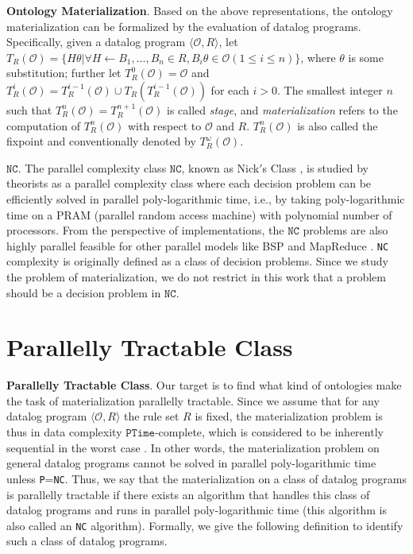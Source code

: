 \documentclass{article}
\begin{document}
\textbf{Ontology Materialization}. Based on the above representations, the ontology materialization can be formalized by the evaluation of datalog programs. Specifically, given a datalog program $\langle\mathcal{O}, R\rangle$, let $T_R(\mathcal{O})=\{H\theta|\forall H\leftarrow B_1,...,B_n\in R, B_i\theta\in\mathcal{O} (1\leq i\leq n)\}$, where $\theta$ is some substitution; further let $T_R^{0}(\mathcal{O})=\mathcal{O}$ and $T_R^{i}(\mathcal{O})=T_R^{i-1}(\mathcal{O})\cup T_R(T_R^{i-1}(\mathcal{O}))$ for each $i>0$. The
smallest integer $n$ such that $T_R^{n}(\mathcal{O})= T_R^{n+1}(\mathcal{O})$ is called \emph{stage}, and \emph{materialization} refers to the computation of $T_R^{n}(\mathcal{O})$ with respect to $\mathcal{O}$ and $R$. $T_R^{n}(\mathcal{O})$ is also called the fixpoint and conventionally denoted by $T_R^{\omega}(\mathcal{O})$.

\textbf{$\texttt{NC}$}. The parallel complexity class $\texttt{NC}$, known as Nick$'$s Class \cite{RAYMOND-GREENLAW}, is studied by theorists as a parallel complexity class where each decision problem can be efficiently solved in parallel poly-logarithmic time, i.e., by taking
poly-logarithmic time on a PRAM (parallel random access machine) with polynomial number of processors.
From the
perspective of implementations, the $\texttt{NC}$ problems are also highly parallel feasible for
other parallel models like BSP \cite{DBLP:journals/cacm/Valiant90} and MapReduce \cite{DBLP:conf/soda/KarloffSV10}. \texttt{NC} complexity is originally defined as a class of decision problems. Since we study the problem of materialization, we do not restrict in this work that a
problem should be a decision problem in $\texttt{NC}$.

\section{Parallelly Tractable Class}

\noindent\textbf{Parallelly Tractable Class}. Our target is to find what kind of ontologies make the task of materialization parallelly tractable. Since we assume that for any datalog program $\langle\mathcal{O}, R\rangle$ the rule set $R$ is fixed, the materialization problem is thus in data complexity $\texttt{PTime}$-complete, which is considered to be inherently sequential in the worst case \cite{RAYMOND-GREENLAW}. In other words, the materialization problem on general datalog programs cannot be solved in parallel poly-logarithmic time unless \texttt{P}=\texttt{NC}. Thus, we say that
the materialization on a class of datalog programs is parallelly tractable if there exists an algorithm that handles this class of datalog programs and runs in parallel poly-logarithmic time (this algorithm is also called an \texttt{NC} algorithm). Formally, we give the following definition to identify such a class of datalog programs.
\end{document}

